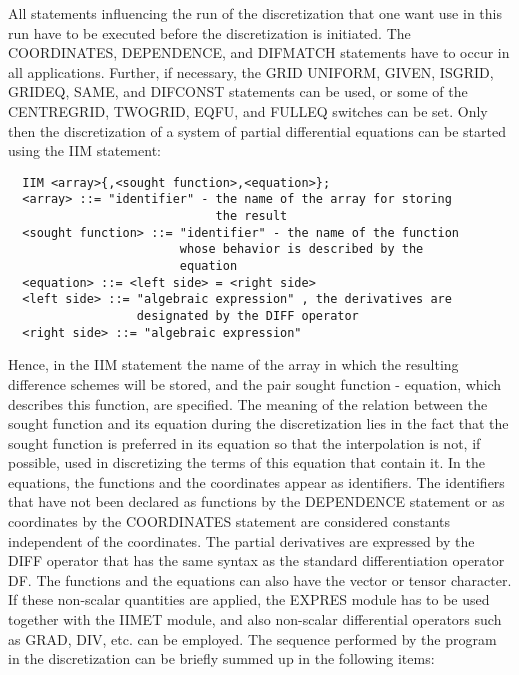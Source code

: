     All statements influencing the run of  the discretization  that one
want use  in this  run have  to be executed before the discretization is
initiated. The COORDINATES, DEPENDENCE, and DIFMATCH  statements have to
occur  in  all  applications.  Further,  if necessary, the GRID UNIFORM,
GIVEN, ISGRID,  GRIDEQ, SAME,  and DIFCONST  statements can  be used, or
some of  the CENTREGRID,  TWOGRID, EQFU, and FULLEQ switches can be set.
Only  then  the  discretization  of  a  system  of  partial differential
equations can be started using the IIM statement:
\begin{verbatim}
  IIM <array>{,<sought function>,<equation>};
  <array> ::= "identifier" - the name of the array for storing
                             the result
  <sought function> ::= "identifier" - the name of the function
                        whose behavior is described by the
                        equation
  <equation> ::= <left side> = <right side>
  <left side> ::= "algebraic expression" , the derivatives are
                  designated by the DIFF operator
  <right side> ::= "algebraic expression"
\end{verbatim}
Hence, in the IIM statement the name of the array in which the resulting
difference schemes will  be  stored,  and  the  pair  sought  function -
equation, which  describes this  function, are specified. The meaning of
the relation  between the  sought function  and its  equation during the
discretization lies in the fact that the sought function is preferred in
its equation so that the interpolation  is  not,  if  possible,  used in
discretizing  the  terms  of  this  equation  that  contain  it.  In the
equations, the functions and the coordinates appear as  identifiers. The
identifiers that  have not  been declared as functions by the DEPENDENCE
statement or as coordinates by the COORDINATES statement  are considered
constants independent  of the  coordinates. The  partial derivatives are
expressed by the DIFF operator that has the same syntax  as the standard
differentiation operator  DF.   The functions and the equations can also
have the vector or tensor character. If these  non-scalar quantities are
applied,  the  EXPRES  module  has  to  be  used together with the IIMET
module, and also non-scalar  differential operators  such as  GRAD, DIV,
etc. can be employed.
     The sequence  performed by the program in the discretization can be
briefly summed up in the following items:
